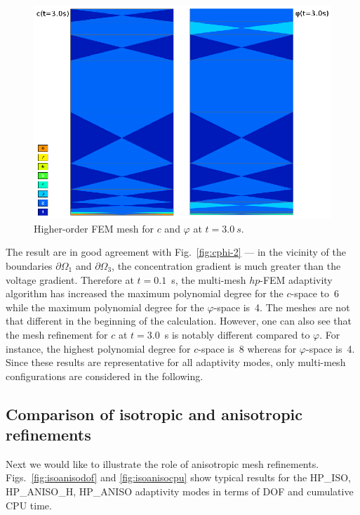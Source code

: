 \begin{figure}[!ht]
  \begin{centering}
  \includegraphics[width=.75\columnwidth]{poly2}
  \caption{\label{fig:poly2} Higher-order FEM mesh for 
  $c$ and $\varphi$ at $t=3.0\ s$. }
  \end{centering}
\end{figure}
\noindent
The result are in good agreement with Fig.~\ref{fig:cphi-2} --- in the vicinity
of the boundaries $\partial \Omega_1$ and $\partial\Omega_3$, the concentration gradient
is much greater than the voltage gradient. Therefore at $t=0.1$~s, 
the multi-mesh $hp$-FEM adaptivity 
algorithm has increased the maximum polynomial degree for the $c$-space to~6 while 
the maximum polynomial degree for the $\varphi$-space is~4. The meshes are not
that different in the beginning of the calculation. However, one can also see that the mesh 
refinement for $c$ at $t=3.0$~s is notably different compared to $\varphi$. For instance,
the highest polynomial degree for $c$-space is~8 whereas for $\varphi$-space is~4.
Since these results are representative for all adaptivity modes, only multi-mesh 
configurations are considered in the following. 

\subsection{Comparison of isotropic and anisotropic refinements}

Next we would like to illustrate the role of anisotropic mesh refinements.
Figs.~\ref{fig:isoanisodof} and \ref{fig:isoanisocpu} show typical results 
for the HP\_ISO, HP\_ANISO\_H,  HP\_ANISO adaptivity modes in terms 
of DOF and cumulative CPU time.


